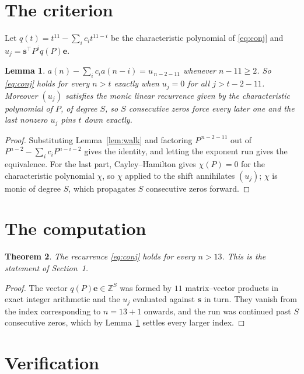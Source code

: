 \documentclass[11pt,a4paper]{article}
\theoremstyle{plain}
\newtheorem{theorem}{Theorem}
\newtheorem{lemma}[theorem]{Lemma}
\theoremstyle{definition}
\begin{document}
\section{The criterion}

Let $q(t)=t^{11}-\sum_i c_i t^{11-i}$ be the characteristic polynomial of
\eqref{eq:conj} and $u_j=\mathbf{s}^{\!\top}P^{j}q(P)\mathbf{e}$.

\begin{lemma}\label{lem:crit}
$a(n)-\sum_i c_i a(n-i)=u_{\,n-2-11}$ whenever $n-11\ge2$. So \eqref{eq:conj}
holds for every $n>t$ exactly when $u_j=0$ for all $j>t-2-11$. Moreover $(u_j)$
satisfies the monic linear recurrence given by the characteristic polynomial of $P$, of
degree $S$, so $S$ consecutive zeros force every later one and the last nonzero $u_j$ pins
$t$ down exactly.
\end{lemma}

\begin{proof}
Substituting Lemma~\ref{lem:walk} and factoring $P^{\,n-2-11}$ out of
$P^{n-2}-\sum_i c_i P^{n-i-2}$ gives the identity, and letting the exponent run gives the
equivalence. For the last part, Cayley--Hamilton gives $\chi(P)=0$ for the characteristic
polynomial $\chi$, so $\chi$ applied to the shift annihilates $(u_j)$; $\chi$ is monic of
degree $S$, which propagates $S$ consecutive zeros forward.
\end{proof}

\section{The computation}

\begin{theorem}
The recurrence \eqref{eq:conj} holds for every $n>13$. This is the statement of
Section~1.
\end{theorem}

\begin{proof}
The vector $q(P)\mathbf{e}\in\mathbb{Z}^{S}$ was formed by $11$ matrix--vector
products in exact integer arithmetic and the $u_j$ evaluated against $\mathbf{s}$ in turn.
They vanish from the index corresponding to $n=13+1$ onwards, and the run was continued
past $S$ consecutive zeros, which by Lemma~\ref{lem:crit} settles every larger index.
\end{proof}

\section{Verification}
\end{document}
